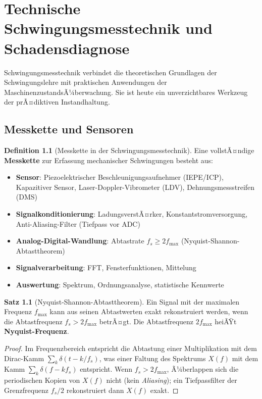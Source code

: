 ﻿\documentclass[a4paper,12pt]{report}
\theoremstyle{definition}
\newtheorem{definition}{Definition}
\newtheorem{satz}{Satz}
\begin{document}
\chapter{Technische Schwingungsmesstechnik und Schadensdiagnose}

Schwingungsmesstechnik verbindet die theoretischen Grundlagen
der Schwingungslehre mit praktischen Anwendungen der MaschinenzustandsÃ¼berwachung.
Sie ist heute ein unverzichtbares Werkzeug der prÃ¤diktiven Instandhaltung.

\section{Messkette und Sensoren}

\begin{definition}[Messkette in der Schwingungsmesstechnik]
Eine vollstÃ¤ndige \textbf{Messkette} zur Erfassung mechanischer Schwingungen
besteht aus:
\begin{itemize}
    \item[-] \textbf{Sensor}: Piezoelektrischer Beschleunigungsaufnehmer (IEPE/ICP),
          Kapazitiver Sensor, Laser-Doppler-Vibrometer (LDV), Dehnungsmessstreifen (DMS)
    \item[-] \textbf{Signalkonditionierung}: LadungsverstÃ¤rker, Konstantstromversorgung,
          Anti-Aliasing-Filter (Tiefpass vor ADC)
    \item[-] \textbf{Analog-Digital-Wandlung}: Abtastrate $f_s \ge 2f_{\max}$
          (Nyquist-Shannon-Abtasttheorem)
    \item[-] \textbf{Signalverarbeitung}: FFT, Fensterfunktionen, Mittelung
    \item[-] \textbf{Auswertung}: Spektrum, Ordnungsanalyse, statistische Kennwerte
\end{itemize}
\end{definition}

\begin{satz}[Nyquist-Shannon-Abtasttheorem]
Ein Signal mit der maximalen Frequenz $f_{\max}$ kann aus seinen Abtastwerten
exakt rekonstruiert werden, wenn die Abtastfrequenz $f_s > 2f_{\max}$ betrÃ¤gt.
Die Abtastfrequenz $2f_{\max}$ heiÃŸt \textbf{Nyquist-Frequenz}.
\end{satz}
\begin{proof}
Im Frequenzbereich entspricht die Abtastung einer Multiplikation mit dem
Dirac-Kamm $\sum_k \delta(t-k/f_s)$, was einer Faltung des Spektrums $X(f)$
mit dem Kamm $\sum_k \delta(f - kf_s)$ entspricht.
Wenn $f_s > 2f_{\max}$, Ã¼berlappen sich die periodischen Kopien von $X(f)$
nicht (kein \emph{Aliasing}); ein Tiefpassfilter der Grenzfrequenz $f_s/2$
rekonstruiert dann $X(f)$ exakt.
\end{proof}
\end{document}
